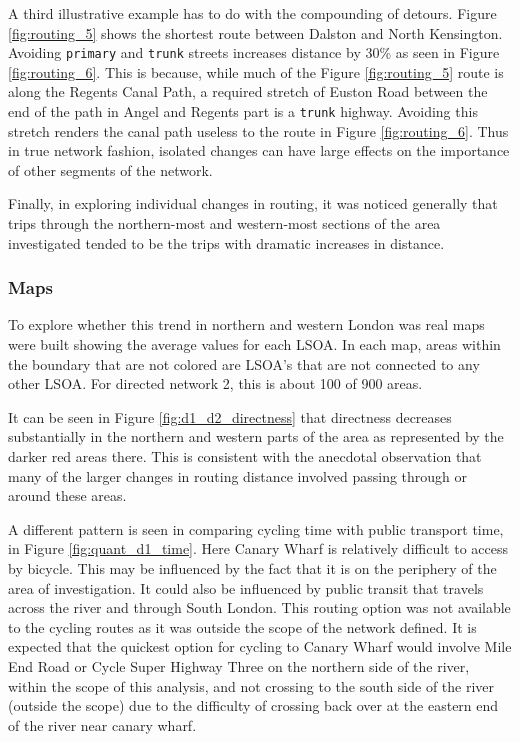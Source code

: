 A third illustrative example has to do with the compounding of detours. Figure \ref{fig:routing_5} shows the shortest route between Dalston and North Kensington. Avoiding \texttt{primary} and \texttt{trunk} streets increases distance by 30\% as seen in Figure \ref{fig:routing_6}. This is because, while much of the Figure \ref{fig:routing_5} route is along the Regents Canal Path, a required stretch of Euston Road between the end of the path in Angel and Regents part is a \texttt{trunk} highway. Avoiding this stretch renders the canal path useless to the route in Figure \ref{fig:routing_6}. Thus in true network fashion, isolated changes can have large effects on the importance of other segments of the network. 

Finally, in exploring individual changes in routing, it was noticed generally that trips through the northern-most and western-most sections of the area investigated tended to be the trips with dramatic increases in distance. 

\subsubsection{Maps}

To explore whether this trend in northern and western London was real maps were built showing the average values for each LSOA. In each map, areas within the boundary that are not colored are LSOA's that are not connected to any other LSOA. For directed network 2, this is about 100 of 900 areas.  

It can be seen in Figure \ref{fig:d1_d2_directness} that directness decreases substantially in the northern and western parts of the area as represented by the darker red areas there. This is consistent with the anecdotal observation that many of the larger changes in routing distance involved passing through or around these areas. 

A different pattern is seen in comparing cycling time with public transport time, in Figure \ref{fig:quant_d1_time}. Here Canary Wharf is relatively difficult to access by bicycle. This may be influenced by the fact that it is on the periphery of the area of investigation. It could also be influenced by public transit that travels across the river and through South London. This routing option was not available to the cycling routes as it was outside the scope of the network defined. It is expected that the quickest option for cycling to Canary Wharf would involve Mile End Road or Cycle Super Highway Three on the northern side of the river, within the scope of this analysis, and not crossing to the south side of the river (outside the scope) due to the difficulty of crossing back over at the eastern end of the river near canary wharf. 



